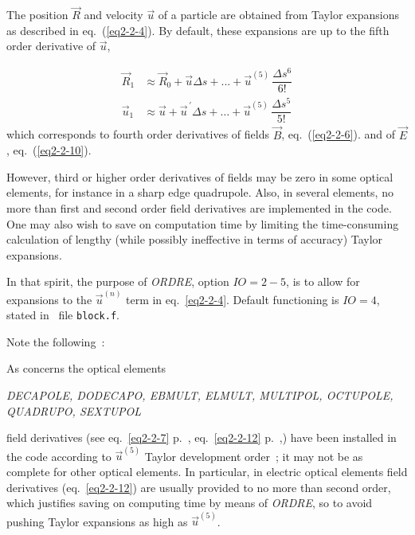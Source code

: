 { The position $ \vec  R $ and velocity $ \vec  u $ of a particle are
obtained from Taylor expansions as described in eq.~(\ref{eq2-2-4}). By default, these 
expansions are up to the fifth order derivative of $ \vec  u$, 

\begin{align*}
	\vec  R_1 
	     & \approx  \vec  R_0 + \vec  u \Delta s +...+ \vec u^{(5)} \, \dfrac{\Delta s^6 }{ 6!} \\
	\vec  u_1 
	     & \approx  \vec  u + \vec  u^{\,\prime} \Delta s  
	        + \ldots + \vec  u^{(5)}\, \dfrac{\Delta s^5 }{ 5!}   
\end{align*}
%
 which corresponds to fourth order derivatives of fields $ \vec  B $, eq.~(\ref{eq2-2-6}).
 and of $ \vec  E $, eq.~(\ref{eq2-2-10}). 

\smallskip

\noindent However, third or  higher order derivatives of fields  may be zero in some 
optical elements, for instance in a sharp edge quadrupole. Also, in 
several elements, no more than  first and second order field 
derivatives  are implemented in the code.  One may also wish to save on computation time by 
limiting the time-consuming calculation of lengthy (while possibly ineffective in terms 
of accuracy) Taylor expansions. 

\bigskip

\noindent In that spirit, the purpose of \textsl{ORDRE}, option $ IO=2-5$,  is to allow for 
expansions  to the  $ \vec  u^{(n)}$ term  in eq.~\ref{eq2-2-4}. Default functioning 
is $IO=4$, stated in \FORTRAN\ file \texttt{block.f}.

\bigskip

\noindent Note the following~: 

\noindent As concerns the optical elements
\begin{center}
	\textsl{
   DECAPOLE, DODECAPO,  EBMULT, ELMULT, 
	MULTIPOL, OCTUPOLE,   \\
              QUADRUPO, SEXTUPOL}
\end{center}
field derivatives (see eq.~\ref{eq2-2-7} p.~\pageref{eq2-2-7}, eq.~\ref{eq2-2-12} p.~\pageref{eq2-2-12},) 
have been installed in the code according 
to $ \vec  u^{(5)}$ Taylor development order~; it may not 
be as complete for  other optical elements. In particular, 
in electric optical elements field  derivatives (eq.~\ref{eq2-2-12}) are usually provided to no more than second 
order, which justifies saving on computing time by means of \textsl{ORDRE}, 
so to avoid pushing Taylor expansions as high as  $ \vec  u^{(5)}$. 


}
